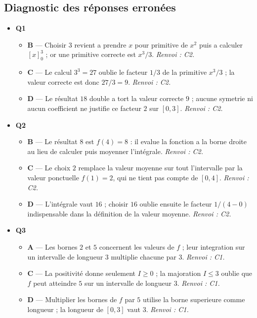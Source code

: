 \subsection*{Diagnostic des réponses erronées}

\begin{itemize}
  \item \textbf{Q1}
  \begin{itemize}
    \item \textbf{B} — Choisir $3$ revient a prendre $x$ pour primitive de $x^2$ puis a calculer $[x]_0^3$ ; or une primitive correcte est $x^3/3$. \emph{Renvoi : C2.}
    \item \textbf{C} — Le calcul $3^3=27$ oublie le facteur $1/3$ de la primitive $x^3/3$ ; la valeur correcte est donc $27/3=9$. \emph{Renvoi : C2.}
    \item \textbf{D} — Le résultat $18$ double a tort la valeur correcte $9$ ; aucune symetrie ni aucun coefficient ne justifie ce facteur $2$ sur $[0,3]$. \emph{Renvoi : C2.}
  \end{itemize}
  \item \textbf{Q2}
  \begin{itemize}
    \item \textbf{B} — Le résultat $8$ est $f(4)=8$ : il evalue la fonction a la borne droite au lieu de calculer puis moyenner l'intégrale. \emph{Renvoi : C2.}
    \item \textbf{C} — Le choix $2$ remplace la valeur moyenne sur tout l'intervalle par la valeur ponctuelle $f(1)=2$, qui ne tient pas compte de $[0,4]$. \emph{Renvoi : C2.}
    \item \textbf{D} — L'intégrale vaut $16$ ; choisir $16$ oublie ensuite le facteur $1/(4-0)$ indispensable dans la définition de la valeur moyenne. \emph{Renvoi : C2.}
  \end{itemize}
  \item \textbf{Q3}
  \begin{itemize}
    \item \textbf{A} — Les bornes $2$ et $5$ concernent les valeurs de $f$ ; leur integration sur un intervalle de longueur $3$ multiplie chacune par $3$. \emph{Renvoi : C1.}
    \item \textbf{C} — La positivité donne seulement $I\geq0$ ; la majoration $I\leq3$ oublie que $f$ peut atteindre $5$ sur un intervalle de longueur $3$. \emph{Renvoi : C1.}
    \item \textbf{D} — Multiplier les bornes de $f$ par $5$ utilise la borne superieure comme longueur ; la longueur de $[0,3]$ vaut $3$. \emph{Renvoi : C1.}

\end{itemize}
\end{itemize}
